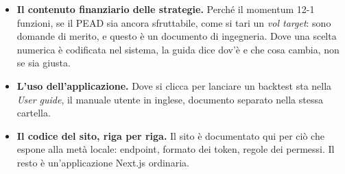 \begin{itemize}
  \item \textbf{Il contenuto finanziario delle strategie.} Perché il momentum
        12-1 funzioni, se il PEAD sia ancora sfruttabile, come si tari un
        \emph{vol target}: sono domande di merito, e questo è un documento di
        ingegneria. Dove una scelta numerica è codificata nel sistema, la
        guida dice dov'è e che cosa cambia, non se sia giusta.
  \item \textbf{L'uso dell'applicazione.} Dove si clicca per lanciare un
        backtest sta nella \emph{User guide}, il manuale utente in inglese,
        documento separato nella stessa cartella.
  \item \textbf{Il codice del sito, riga per riga.} Il sito è documentato qui
        per ciò che espone alla metà locale: endpoint, formato dei token,
        regole dei permessi. Il resto è un'applicazione Next.js ordinaria.
\end{itemize}
